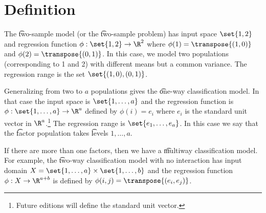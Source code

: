 

\section*{Definition}

The \t{two-sample model} (or the \t{two-sample problem}) has input space $\set{1, 2}$ and regression function $\phi : \set{1, 2} \to \R ^2$ where $\phi (1) = \transpose{(1, 0)}$ and $\phi (2) = \transpose{(0, 1)}$.
In this case, we model two populations (corresponding to 1 and 2) with different means but a common variance.
The regression range is the set $\set{(1, 0), (0, 1)}$.

Generalizing from two to $a$ populations gives the \t{one-way classification model}.
In that case the input space is $\set{1, \dots , a}$ and the regression function is $\phi : \set{1, \dots , a} \to \R ^a$ defined by $\phi (i) = e_i$ where $e_i$ is the standard unit vector in $\R ^a$.\footnote{Future editions will define the standard unit vector.}
The regression range is $\set{e_1, \dots , e_a}$.
In this case we say that the \t{factor} population takes \t{levels} $1, \dots , a$.

If there are more than one factors, then we have a \t{multiway classification model}.
For example, the \t{two-way classification model with no interaction} has input domain $X = \set{1, \dots , a} \times \set{1, \dots , b}$ and the regression function $\phi : X \to \R ^{a + b}$ is defined by $\phi (i, j) = \transpose{(e_i, e_j)}$.

\blankpage